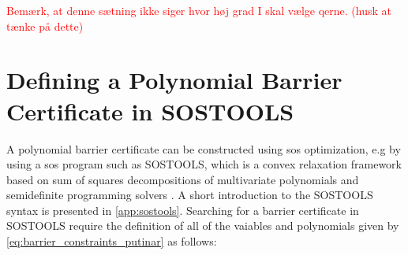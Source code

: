 \textcolor{red}{Bemærk, at denne sætning ikke siger hvor høj grad I skal vælge qerne. (husk at tænke på dette)}



 








 
	

\section{Defining a Polynomial Barrier Certificate in SOSTOOLS}\label{sec:app_sostools_barrier_search}

A polynomial barrier certificate can be constructed using \gls{sos} optimization, e.g by using a \gls{sos} program such as SOSTOOLS, which is a convex relaxation framework based on sum of squares decompositions of multivariate polynomials and semidefinite programming solvers \citep{bib:prajna_framework}. A short introduction to the SOSTOOLS syntax is presented in \autoref{app:sostools}.
Searching for a barrier certificate in SOSTOOLS require the definition of all of the vaiables and polynomials given by \autoref{eq:barrier_constraints_putinar} as follows:

